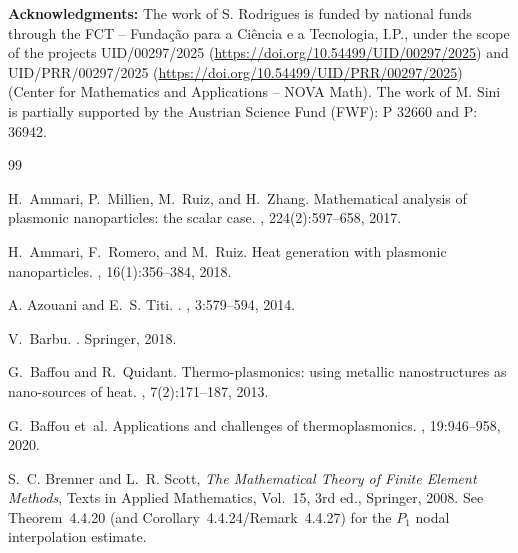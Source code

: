 \documentclass[11pt,a4paper]{article}
\numberwithin{equation}{section}
\theoremstyle{definition}
\newcommand{\1}{\mathbbm{1}}
\begin{document}
\noindent
{\bf Acknowledgments:}
The work of S. Rodrigues is funded by national funds through the FCT -- Funda\c{c}\~{a}o para a Ci\^{e}ncia e a Tecnologia, I.P., under the scope of the projects UID/00297/2025 (\url{https://doi.org/10.54499/UID/00297/2025}) and UID/PRR/00297/2025 (\url{https://doi.org/10.54499/UID/PRR/00297/2025}) (Center for Mathematics and Applications -- NOVA Math). The work of M. Sini is partially supported by the Austrian Science Fund (FWF): P 32660 and  P: 36942.  












\bigskip



\begin{thebibliography}{99}

H.~Ammari, P.~Millien, M.~Ruiz, and H.~Zhang.
\newblock Mathematical analysis of plasmonic nanoparticles: the scalar case.
, 224(2):597--658, 2017.

H.~Ammari, F.~Romero, and M.~Ruiz.
\newblock Heat generation with plasmonic nanoparticles.
, 16(1):356--384, 2018.


A. Azouani and E.~S. Titi.
. , 3:579--594, 2014.

V.~Barbu.
.
\newblock Springer, 2018.

G.~Baffou and R.~Quidant.
\newblock Thermo-plasmonics: using metallic nanostructures as nano-sources of heat.
, 7(2):171--187, 2013.

G.~Baffou et~al.
\newblock Applications and challenges of thermoplasmonics.
, 19:946--958, 2020.

S.~C. Brenner and L.~R. Scott,
\emph{The Mathematical Theory of Finite Element Methods},
Texts in Applied Mathematics, Vol.~15, 3rd ed., Springer, 2008.
See Theorem~4.4.20 (and Corollary~4.4.24/Remark~4.4.27) for the $P_1$ nodal
interpolation estimate.



\end{thebibliography}
\end{document}
